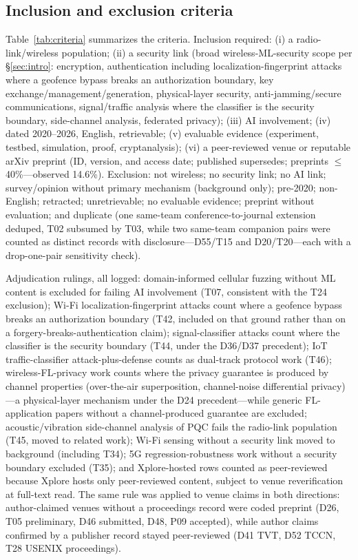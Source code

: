 \documentclass[11pt,a4paper]{article}
\begin{document}
\subsection{Inclusion and exclusion criteria}
Table~\ref{tab:criteria} summarizes the criteria. Inclusion required: (i) a radio-link/wireless population; (ii) a security link (broad wireless-ML-security scope per \S\ref{sec:intro}: encryption, authentication including localization-fingerprint attacks where a geofence bypass breaks an authorization boundary, key exchange/management/generation, physical-layer security, anti-jamming/secure communications, signal/traffic analysis where the classifier is the security boundary, side-channel analysis, federated privacy); (iii) AI involvement; (iv) dated 2020--2026, English, retrievable; (v) evaluable evidence (experiment, testbed, simulation, proof, cryptanalysis); (vi) a peer-reviewed venue or reputable arXiv preprint (ID, version, and access date; published supersedes; preprints $\le$40\%---observed 14.6\%). Exclusion: not wireless; no security link; no AI link; survey/opinion without primary mechanism (background only); pre-2020; non-English; retracted; unretrievable; no evaluable evidence; preprint without evaluation; and duplicate (one same-team conference-to-journal extension deduped, T02 subsumed by T03, while two same-team companion pairs were counted as distinct records with disclosure---D55/T15 and D20/T20---each with a drop-one-pair sensitivity check).

Adjudication rulings, all logged: domain-informed cellular fuzzing without ML content is excluded for failing AI involvement (T07, consistent with the T24 exclusion); Wi-Fi localization-fingerprint attacks count where a geofence bypass breaks an authorization boundary (T42, included on that ground rather than on a forgery-breaks-authentication claim); signal-classifier attacks count where the classifier is the security boundary (T44, under the D36/D37 precedent); IoT traffic-classifier attack-plus-defense counts as dual-track protocol work (T46); wireless-FL-privacy work counts where the privacy guarantee is produced by channel properties (over-the-air superposition, channel-noise differential privacy)---a physical-layer mechanism under the D24 precedent---while generic FL-application papers without a channel-produced guarantee are excluded; acoustic/vibration side-channel analysis of PQC fails the radio-link population (T45, moved to related work); Wi-Fi sensing without a security link moved to background (including T34); 5G regression-robustness work without a security boundary excluded (T35); and Xplore-hosted rows counted as peer-reviewed because Xplore hosts only peer-reviewed content, subject to venue reverification at full-text read. The same rule was applied to venue claims in both directions: author-claimed venues without a proceedings record were coded preprint (D26, T05 preliminary, D46 submitted, D48, P09 accepted), while author claims confirmed by a publisher record stayed peer-reviewed (D41 TVT, D52 TCCN, T28 USENIX proceedings).
\end{document}

